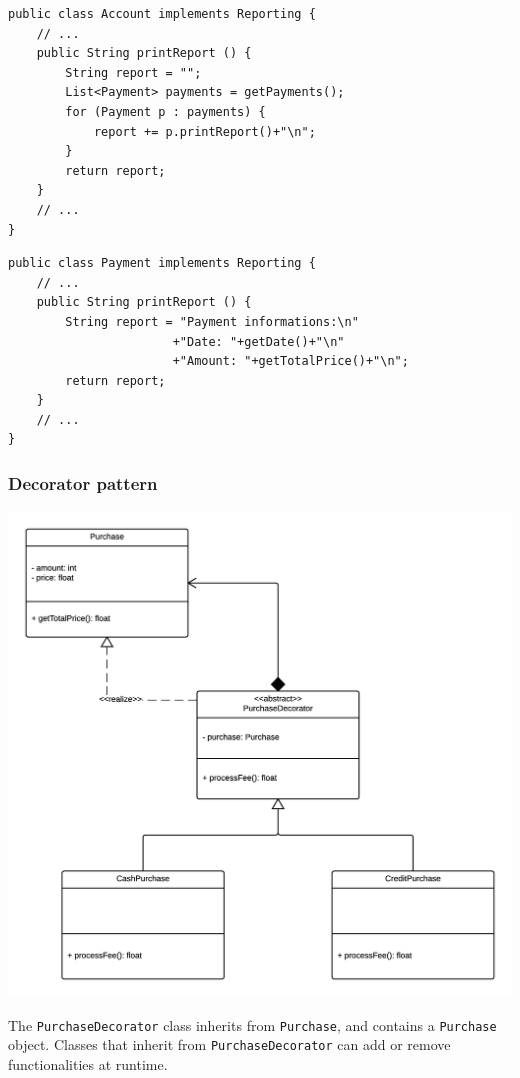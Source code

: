 \documentclass[11pt, a4paper]{article}
\newcommand{\settextlisting}{\lstset{ basicstyle=\small\ttfamily }}
\begin{document}
\begin{lstlisting}
public class Account implements Reporting {
	// ...
	public String printReport () {
		String report = "";
		List<Payment> payments = getPayments();
		for (Payment p : payments) {
			report += p.printReport()+"\n";
		}
		return report;
	}
	// ...
}
\end{lstlisting}


\begin{lstlisting}
public class Payment implements Reporting {
	// ...
	public String printReport () {
		String report = "Payment informations:\n"
					   +"Date: "+getDate()+"\n"
					   +"Amount: "+getTotalPrice()+"\n";
		return report;
	}
	// ...
}

\end{lstlisting}




\subsubsection{Decorator pattern}


\includegraphics[width=\textwidth]{DecoratorPattern.png}

\medskip
\settextlisting
The \lstinline|PurchaseDecorator| class inherits from \lstinline|Purchase|, and contains a \lstinline|Purchase| object.
Classes that inherit from \lstinline|PurchaseDecorator| can add or remove functionalities at runtime.
\end{document}
